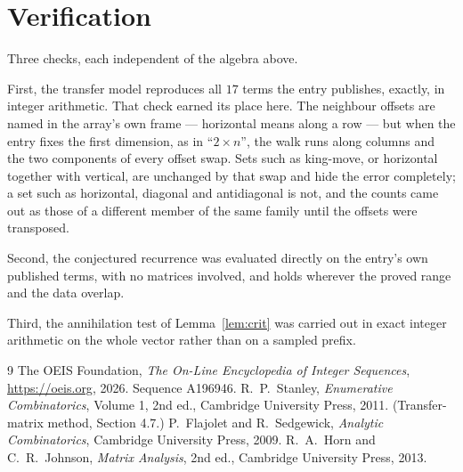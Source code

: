 \documentclass[11pt,a4paper]{article}
\theoremstyle{plain}
\theoremstyle{definition}
\begin{document}
\section{Verification}

Three checks, each independent of the algebra above.

First, the transfer model reproduces all $17$ terms the entry publishes, exactly, in
integer arithmetic. That check earned its place here. The neighbour offsets are named in the
array's own frame --- horizontal means along a row --- but when the entry fixes the first
dimension, as in ``$2\times n$'', the walk runs along columns and the two components of every
offset swap. Sets such as king-move, or horizontal together with vertical, are unchanged by
that swap and hide the error completely; a set such as horizontal, diagonal and antidiagonal
is not, and the counts came out as those of a different member of the same family until the
offsets were transposed.

Second, the conjectured recurrence was evaluated directly on the entry's own published terms,
with no matrices involved, and holds wherever the proved range and the data overlap.

Third, the annihilation test of Lemma~\ref{lem:crit} was carried out in exact integer
arithmetic on the whole vector rather than on a sampled prefix.

\begin{thebibliography}{9}
 The OEIS Foundation, \emph{The On-Line Encyclopedia of Integer
Sequences}, \url{https://oeis.org}, 2026. Sequence A196946.
 R.~P.~Stanley, \emph{Enumerative Combinatorics}, Volume 1, 2nd ed.,
Cambridge University Press, 2011. (Transfer-matrix method, Section 4.7.)
 P.~Flajolet and R.~Sedgewick, \emph{Analytic Combinatorics}, Cambridge
University Press, 2009.
 R.~A.~Horn and C.~R.~Johnson, \emph{Matrix Analysis}, 2nd ed., Cambridge
University Press, 2013.
\end{thebibliography}
\end{document}
